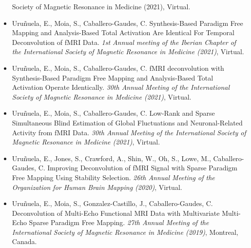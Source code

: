 \begin{itemize}
{{    Society of Magnetic Resonance in Medicine (2021)}, Virtual.}
    \item {Uruñuela, E., Moia, S., Caballero-Gaudes, C. Synthesis-Based Paradigm
    Free Mapping and Analysis-Based Total Activation Are Identical For Temporal
    Deconvolution of fMRI Data. \textit{1st Annual meeting of the Iberian
    Chapter of the International Society of Magnetic Resonance in Medicine
    (2021)}, Virtual.}
    \item {Uruñuela, E., Moia, S., Caballero-Gaudes, C. fMRI deconvolution with
    Synthesis-Based Paradigm Free Mapping and Analysis-Based Total Activation Operate
    Identically. \textit{30th Annual Meeting of the International Society of
    Magnetic Resonance in Medicine (2021)}, Virtual.}
    \item {Uruñuela, E., Moia, S., Caballero-Gaudes, C. Low-Rank and Sparse
    Simultaneous Blind Estimation of Global Fluctuations and Neuronal-Related
    Activity from fMRI Data. \textit{30th Annual Meeting of the International
    Society of Magnetic Resonance in Medicine (2021)}, Virtual.}
    \item {Uruñuela, E., Jones, S., Crawford, A., Shin, W., Oh, S., Lowe, M.,
    Caballero-Gaudes, C. Improving Deconvolution of fMRI Signal with Sparse
    Paradigm Free Mapping Using Stability Selection. \textit{26th Annual Meeting of the
    Organization for Human Brain Mapping (2020)}, Virtual.}
    \item {Uruñuela, E., Moia, S., Gonzalez-Castillo, J., Caballero-Gaudes, C.
    Deconvolution of Multi-Echo Functional MRI Data with Multivariate Multi-Echo
    Sparse Paradigm Free Mapping. \textit{27th Annual Meeting of the International
    Society of Magnetic Resonance in Medicine (2019)}, Montreal, Canada.}
\end{itemize}
